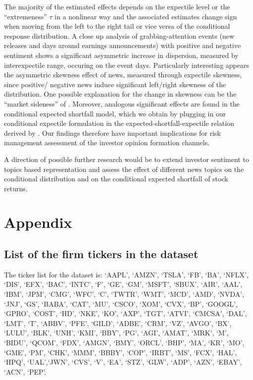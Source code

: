 \documentclass[]{article}
\begin{document}
The majority of the estimated effects depends on the expectile level or the ``extremeness'' \(\tau\) in a nonlinear way and the associated estimates change sign when moving from the left to the right tail or vice versa of the conditional response distribution. A close up analysis of grabbing-attention events (new releases and days around earnings announcements) with positive and negative sentiment shows a significant asymmetric increase in dispersion, measured by interexpectile range, occuring on the event days. Particularly interesting appears the asymmetric skewness effect of news, measured through expectile skewness, since positive/ negative news induce significant left/right skewness of the distribution. One possible explanation for the change in skewness can be the ``market sideness'' of \cite{SARKAR2009}. Moreover, analogous significant effects are found in the conditional expected shortfall model, which we obtain by plugging in our conditional expectile formulation in the expected-shortfall-expectile relation derived by \cite{Taylor2008}. Our findings therefore have important implications for risk management assessment of the investor opinion formation channels.

A direction of possible further research would be to extend investor sentiment to topics based representation and assess the effect of different news topics on the conditional distribution and on the conditional expected shortfall of stock returns.

\newpage
\hypertarget{appendix}{
\section*{Appendix}\label{appendix}}

\hypertarget{list-of-the-firm-tickers-in-the-dataset}{%
\subsection*{List of the firm tickers in the dataset}\label{list-of-the-firm-tickers-in-the-dataset}}

The ticker list for the dataset is:
`AAPL', `AMZN', `TSLA', `FB', `BA', `NFLX', `DIS', `EFX', `BAC', `INTC', `F', `GE', `GM',
`MSFT', `SBUX', `AIR', `AAL', `IBM', `JPM', `CMG', `WFC', `C', `TWTR', `WMT', `MCD', `AMD', `NVDA', `JNJ', `GS',
`BABA', `CAT', `MU', `CSCO', `XOM', `CVX', `BP', `GOOGL', `GPRO', `COST', `HD', `NKE', `KO',
`AXP', `TGT', `ATVI', `CMCSA', `DAL', `LMT', `T', `ABBV', `PFE', `GILD', `ADBE', `CRM', `VZ', `AVGO', `BX',
`LULU', `BLK', `UNH', `KMI', `BBY', `PG', `AGI', `AMAT', `MRK', `M', `BIDU', `QCOM', `FDX', `AMGN',
`BMY', `ORCL', `BHP', `MA', `KR', `MO', `GME', `PM', `CHK', `MMM', `BBBY', `COP', `IRBT', `MS',
`FCX', `HAL', `HPQ', `UAL',`JWN', `CVS', `V', `EA', `STZ', `GLW', `ADP', `AZN', `EBAY', `ACN', `PEP'.
\end{document}
